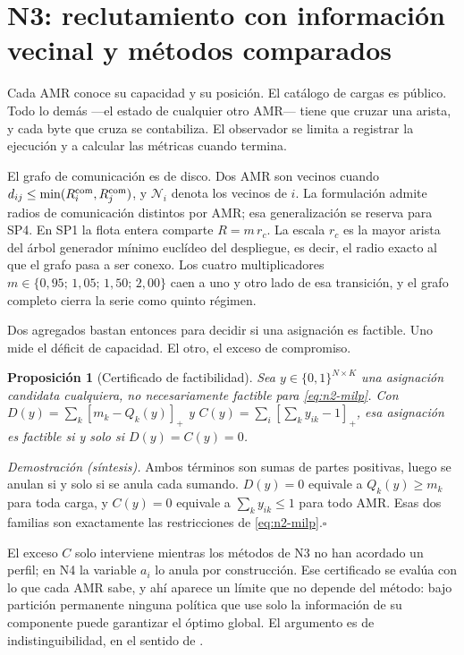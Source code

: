 \documentclass[12pt,a4paper]{article}
\newtheorem{n1prop}{Proposición}
\theoremstyle{remark}
\theoremstyle{plain}
\newcommand{\proofsketch}[1]{%
  {\small\textit{Demostración (síntesis).} #1\hfill$\square$\par}
}
\begin{document}
\section{N3: reclutamiento con información vecinal y métodos comparados}

Cada AMR conoce su capacidad y su posición. El catálogo de cargas es público. Todo
lo demás ---el estado de cualquier otro AMR--- tiene que cruzar una arista, y cada
byte que cruza se contabiliza. El observador se limita a registrar la ejecución y
a calcular las métricas cuando termina.

El grafo de comunicación es de disco. Dos AMR son vecinos cuando
$d_{ij}\le\min(R_i^{\rm com},R_j^{\rm com})$, y $\mathcal N_i$ denota los vecinos
de $i$. La formulación admite radios de comunicación distintos por AMR; esa
generalización se reserva para SP4. En SP1 la flota entera comparte
$R=m\,r_c$. La escala $r_c$ es la mayor arista del
árbol generador mínimo euclídeo del despliegue, es decir, el radio exacto al que el
grafo pasa a ser conexo. Los cuatro multiplicadores
$m\in\{0{,}95;\,1{,}05;\,1{,}50;\,2{,}00\}$ caen a uno y otro lado de esa
transición, y el grafo completo cierra la serie como quinto régimen.


Dos agregados bastan entonces para decidir si una asignación es factible. Uno mide
el déficit de capacidad. El otro, el exceso de compromiso.

\begin{n1prop}[Certificado de factibilidad]
Sea $y\in\{0,1\}^{N\times K}$ una asignación candidata cualquiera, no
necesariamente factible para \eqref{eq:n2-milp}. Con
$D(y)=\sum_k[m_k-Q_k(y)]_+$ y $C(y)=\sum_i[\sum_ky_{ik}-1]_+$, esa asignación es
factible si y solo si $D(y)=C(y)=0$.
\end{n1prop}
\proofsketch{Ambos términos son sumas de partes positivas, luego se anulan si y
solo si se anula cada sumando. $D(y)=0$ equivale a $Q_k(y)\ge m_k$ para toda carga,
y $C(y)=0$ equivale a $\sum_ky_{ik}\le1$ para todo AMR. Esas dos familias son
exactamente las restricciones de \eqref{eq:n2-milp}.}
El exceso $C$ solo interviene mientras los métodos de N3 no han acordado un
perfil; en N4 la variable $a_i$ lo anula por construcción. Ese certificado se
evalúa con lo que cada AMR sabe, y ahí aparece un límite que no depende del
método: bajo partición permanente ninguna política que use solo la información
de su componente puede garantizar el óptimo global. El argumento es de
indistinguibilidad, en el sentido de \citet{halpernMoses1990Knowledge}.
\end{document}
